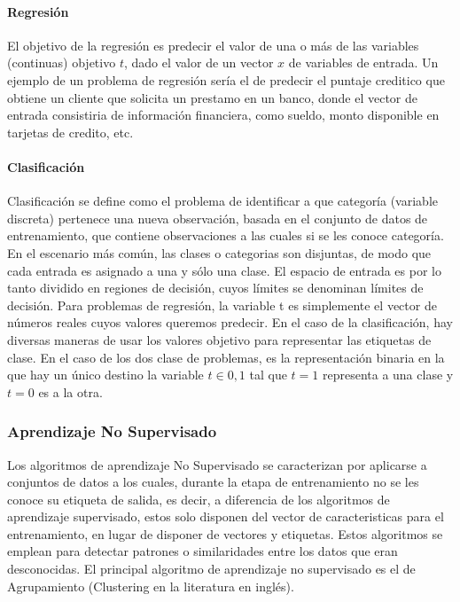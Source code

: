 \documentclass[a4paper,11pt,spanish]{book}
\begin{document}
	\paragraph {Regresión}
	  El objetivo de la regresión es predecir el valor de una o más de las variables (continuas) objetivo $t$, dado el valor de un vector $x$ de variables de entrada.
	  Un ejemplo de un problema de regresión sería el de predecir el puntaje creditico que obtiene un cliente que solicita un prestamo en un banco, donde el vector de entrada
	  consistiria de información financiera, como sueldo, monto disponible en tarjetas de credito, etc.

	\paragraph {Clasificación}
	  Clasificación se define como el problema de identificar a que categoría (variable discreta) pertenece una nueva observación, basada en el conjunto de datos de entrenamiento,
	  que contiene observaciones a las cuales  si se les conoce categoría. En el escenario más común, las clases o categorias son disjuntas,
	  de modo que cada entrada es asignado a una y sólo una clase. El espacio de entrada es por lo tanto dividido en regiones de decisión, cuyos límites se denominan límites de decisión.
	  Para problemas de regresión, la variable t es simplemente el vector de números reales cuyos valores queremos predecir. En el caso de la clasificación,
	  hay diversas maneras de usar los valores objetivo para representar las etiquetas de clase. En el caso de los dos clase de problemas, es la representación binaria
	  en la que hay un único destino la variable $t \in {0, 1}$ tal que $t = 1$ representa a una clase y $t = 0$ es a la otra.

      \subsubsection{Aprendizaje No Supervisado}
	  Los algoritmos de aprendizaje No Supervisado se caracterizan por aplicarse a conjuntos de datos a los cuales, durante la etapa de entrenamiento no se les conoce su etiqueta
	  de salida, es decir, a diferencia de los algoritmos de aprendizaje supervisado, estos solo disponen del vector de caracteristicas para el entrenamiento, en lugar de disponer
	  de vectores y etiquetas. Estos algoritmos se emplean para detectar patrones o similaridades entre los datos que eran desconocidas.
	  El principal algoritmo de aprendizaje no supervisado es el de Agrupamiento (Clustering en la literatura en inglés).
\end{document}

